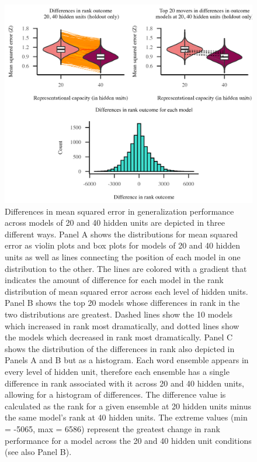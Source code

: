 \documentclass[
  ,man,floatsintext]{apa6}
\begin{document}
\begin{figure}

{\centering \includegraphics[width=1\linewidth]{img/results_figure4} 

}

\caption{Differences in mean squared error in generalization performance across models of 20 and 40 hidden units are depicted in three different ways. Panel A shows the distributions for mean squared error as violin plots and box plots for models of 20 and 40 hidden units as well as lines connecting the position of each model in one distribution to the other. The lines are colored with a gradient that indicates the amount of difference for each model in the rank distribution of mean squared error across each level of hidden units. Panel B shows the top 20 models whose differences in rank in the two distributions are greatest. Dashed lines show the 10 models which increased in rank most dramatically, and dotted lines show the models which decreased in rank most dramatically. Panel C shows the distribution of the differences in rank also depicted in Panels A and B but as a histogram. Each word ensemble appears in every level of hidden unit, therefore each ensemble has a single difference in rank associated with it across 20 and 40 hidden units, allowing for a histogram of differences. The difference value is calculated as the rank for a given ensemble at 20 hidden units minus the same model’s rank at 40 hidden units. The extreme values (min = -5065, max = 6586) represent the greatest change in rank performance for a model across the 20 and 40 hidden unit conditions (see also Panel B).}\label{fig:figure4}
\end{figure}
\end{document}
